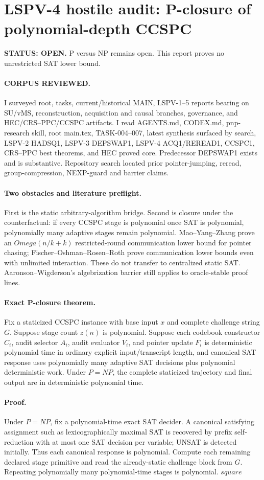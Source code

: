 \documentclass[11pt]{article}
\begin{document}
\section*{LSPV-4 hostile audit: P-closure of polynomial-depth CCSPC}
\textbf{STATUS: OPEN.} P versus NP remains open. This report proves no unrestricted SAT lower bound.
\paragraph{CORPUS REVIEWED.} I surveyed root, tasks, current/historical MAIN, LSPV-1--5 reports bearing on SU/vMS, reconstruction, acquisition and causal branches, governance, and HEC/CRS--PPC/CCSPC artifacts. I read AGENTS.md, CODEX.md, pnp-research skill, root main.tex, TASK-004--007, latest synthesis surfaced by search, LSPV-2 HADSQ1, LSPV-3 DEPSWAP1, LSPV-4 ACQ1/REREAD1, CCSPC1, CRS--PPC best theorems, and HEC proved core. Predecessor DEPSWAP1 exists and is substantive. Repository search located prior pointer-jumping, reread, group-compression, NEXP-guard and barrier claims.
\paragraph{Two obstacles and literature preflight.} First is the static arbitrary-algorithm bridge. Second is closure under the counterfactual: if every CCSPC stage is polynomial once SAT is polynomial, polynomially many adaptive stages remain polynomial. Mao--Yang--Zhang prove an \(Omega(n/k+k)\) restricted-round communication lower bound for pointer chasing; Fischer--Oshman--Rosen--Roth prove communication lower bounds even with unlimited interaction. These do not transfer to centralized static SAT. Aaronson--Wigderson's algebrization barrier still applies to oracle-stable proof lines.
\paragraph{Exact P-closure theorem.} Fix a staticized CCSPC instance with base input \(x\) and complete challenge string \(G\). Suppose stage count \(z(n)\) is polynomial. Suppose each codebook constructor \(C_i\), audit selector \(A_i\), audit evaluator \(V_i\), and pointer update \(F_i\) is deterministic polynomial time in ordinary explicit input/transcript length, and canonical SAT response uses polynomially many adaptive SAT decisions plus polynomial deterministic work. Under \(P=NP\), the complete staticized trajectory and final output are in deterministic polynomial time.
\paragraph{Proof.} Under \(P=NP\), fix a polynomial-time exact SAT decider. A canonical satisfying assignment such as lexicographically maximal SAT is recovered by prefix self-reduction with at most one SAT decision per variable; UNSAT is detected initially. Thus each canonical response is polynomial. Compute each remaining declared stage primitive and read the already-static challenge block from \(G\). Repeating polynomially many polynomial-time stages is polynomial. \(square\)
\end{document}
